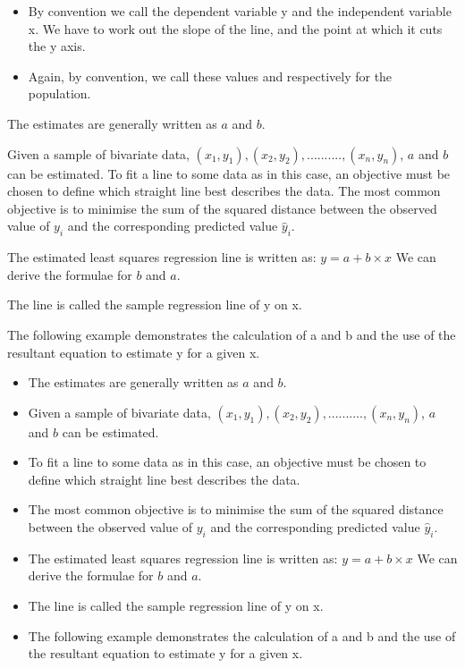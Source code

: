 \documentclass[]{report}
\begin{document}
\begin{itemize}

	\item By convention we call the dependent variable y
	and the independent variable x. We have to work out the slope of the line, and the
	point at which it cuts the y axis.
	
	\item	Again, by convention, we call these values and respectively for the population.
\end{itemize}

The estimates are generally written as $a$ and $b$.

Given a sample of bivariate data, $(x_1,y_1),(x_2,y_2) ,.........., (x_n,y_n)$, $a$ and $b$ can be
estimated. To fit a line to some data as in this case, an objective must be chosen to
define which straight line best describes the data. The most common objective is to
minimise the sum of the squared distance between the observed value of $y_i$
and the corresponding predicted value $\hat{y}_i$.

The estimated least squares regression line is written as:
$y = a + b\times x$
We can derive the formulae for $b$ and $a$.



The line is called the sample regression line of y on x.

The following example demonstrates the calculation of a and b and the use of the resultant
equation to estimate y for a given x.

\newpage


	
\begin{itemize}
\item 	The estimates are generally written as $a$ and $b$.
\item 	Given a sample of bivariate data, $(x_1,y_1),(x_2,y_2) ,.........., (x_n,y_n)$, $a$ and $b$ can be
	estimated. 
\item  To fit a line to some data as in this case, an objective must be chosen to
	define which straight line best describes the data. 
\item  The most common objective is to
	minimise the sum of the squared distance between the observed value of $y_i$
	and the corresponding predicted value $\hat{y}_i$.
\item 	The estimated least squares regression line is written as:
	$y = a + b\times x$
	We can derive the formulae for $b$ and $a$.
\item 	The line is called the sample regression line of y on x.
\item 	The following example demonstrates the calculation of a and b and the use of the resultant
	equation to estimate y for a given x.
\end{itemize}
\end{document}
